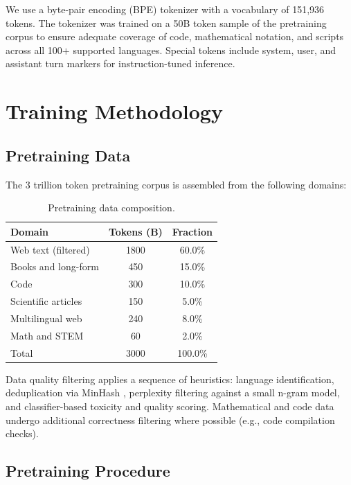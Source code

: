 \documentclass[11pt,a4paper]{article}
\begin{document}
We use a byte-pair encoding (BPE) tokenizer with a vocabulary of 151,936 tokens. The tokenizer
was trained on a 50B token sample of the pretraining corpus to ensure adequate coverage of code,
mathematical notation, and scripts across all 100$+$ supported languages. Special tokens include
system, user, and assistant turn markers for instruction-tuned inference.

\section{Training Methodology}

\subsection{Pretraining Data}

The 3 trillion token pretraining corpus is assembled from the following domains:

\begin{table}[H]
\centering
\caption{Pretraining data composition.}
\label{tab:data}
\begin{tabular}{lcc}
\toprule
\textbf{Domain} & \textbf{Tokens (B)} & \textbf{Fraction} \\
\midrule
Web text (filtered)   & 1800 & 60.0\% \\
Books and long-form   &  450 & 15.0\% \\
Code                  &  300 & 10.0\% \\
Scientific articles   &  150 &  5.0\% \\
Multilingual web      &  240 &  8.0\% \\
Math and STEM         &   60 &  2.0\% \\
\midrule
Total                 & 3000 & 100.0\% \\
\bottomrule
\end{tabular}
\end{table}

Data quality filtering applies a sequence of heuristics: language identification, deduplication
via MinHash \cite{broder1997minwise}, perplexity filtering against a small n-gram model, and
classifier-based toxicity and quality scoring. Mathematical and code data undergo additional
correctness filtering where possible (e.g., code compilation checks).

\subsection{Pretraining Procedure}
\end{document}
